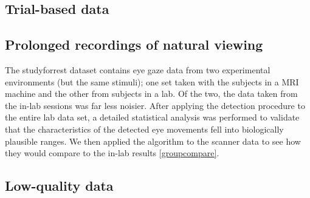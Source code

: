 \subsection*{Trial-based data}








\subsection*{Prolonged recordings of natural viewing}\label{ana_2}

The studyforrest dataset contains eye gaze data from two experimental environments (but the same stimuli); one set taken with the subjects in a MRI machine and the other from subjects in a lab. Of the two, the data taken from the in-lab sessions was far less noisier. After applying the detection procedure to the entire lab data set, a detailed statistical analysis was performed to validate that the characteristics of the detected eye movements fell into biologically plausible ranges. We then applied the algorithm to the scanner data to see how they would compare to the in-lab results \ref{groupcompare}. 

\subsection*{Low-quality data}\label{ana_3}


